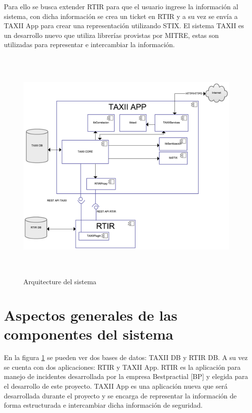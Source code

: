 	\bigskip
	
	Para ello se busca extender RTIR para que el usuario ingrese la información al sistema, con
		dicha información se crea un ticket en RTIR y a su vez se envía a TAXII App para crear una representación utilizando
		STIX. El sistema TAXII es un desarrollo nuevo que utiliza librerías provistas por MITRE, estas son utilizadas para
		representar e intercambiar la información.
	
	
	\bigskip
	
	\begin{figure}[ht!]
		\centering
		\includegraphics[width=5.7638in,height=4.6846in]{Diseno21-img/Diseno21-img003.png} 
		\caption{Arquitecture del sistema}	
		\label{fig.arquitecturasistema}
	\end{figure}
	\bigskip
	
	
	\section{Aspectos generales de las componentes del sistema}
	
	

	En la figura \ref{fig.arquitecturasistema} se pueden ver dos bases de datos: TAXII DB y RTIR DB. A su vez se cuenta con dos
		aplicaciones: RTIR y TAXII App. RTIR es la aplicación para manejo de incidentes desarrollada por la empresa
		Bestpractial [BP] y elegida para el desarrollo de este proyecto. TAXII App es una aplicación nueva que será
		desarrollada durante el proyecto y se encarga de representar la información de forma estructurada e intercambiar dicha
		información de seguridad.
    \bigskip
	
